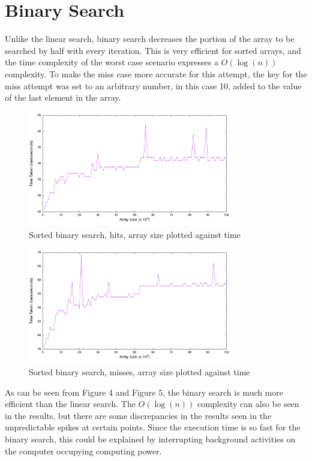 \documentclass[a4paper,11pt]{article}
\begin{document}
\section*{Binary Search}
Unlike the linear search, binary search decreases the portion of the array to be searched by half with every iteration.
This is very efficient for sorted arrays, and the time complexity of the worst case scenario expresses a $O(\log(n))$ complexity.
To make the miss case more accurate for this attempt, the key for the miss attempt was set to an arbitrary number, in this case 10,
added to the value of the last element in the array.

\begin{figure}[h!]
  \centering
  \includegraphics[width=0.8\textwidth]{sorted_search_hit_plot}
  \caption{Sorted binary search, hits, array size plotted against time}
  \label{fig:sorted_search_hit_plot}
\end{figure}

\begin{figure}[h!]
  \centering
  \includegraphics[width=0.8\textwidth]{sorted_search_miss_plot}
  \caption{Sorted binary search, misses, array size plotted against time}
  \label{fig:sorted_search_miss_plot}
\end{figure}

As can be seen from Figure 4 and Figure 5, the binary search is much more efficient than the linear search.
The $O(\log(n))$ complexity can also be seen in the results, but there are some discrepancies in the results seen in the unpredictable spikes at certain points.
Since the execution time is so fast for the binary search, this could be explained by interrupting background activities on the computer occupying computing power.
\end{document}
